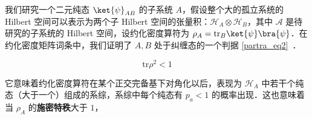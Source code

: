 

我们研究一个二元纯态 $\ket{\psi}_{AB}$ 的子系统 $A$，假设整个大的孤立系统的 Hilbert 空间可以表示为两个子 Hilbert 空间的张量积：$\mathcal{H}_A\otimes \mathcal{H}_B$，其中 $\mathcal A$ 是待研究的子系统的 Hilbert 空间，设约化密度算符为 $\rho_A=\text{tr}_B \ket{\psi}\bra{\psi}$．在约化密度矩阵词条中，我们证明了 $A,B$ 处于纠缠态的一个判据 \autoref{partra_eq2}~．

\begin{equation}
\text{tr} \rho^2 <1
\end{equation}

它意味着约化密度算符在某个正交完备基下对角化以后，表现为 $\mathcal{H}_A$ 中若干个纯态（大于一个）组成的系综，系综中每个纯态有 $p_a<1$ 的概率出现．这也意味着当 $\rho_A$ 的\textbf{施密特秩}大于 $1$，